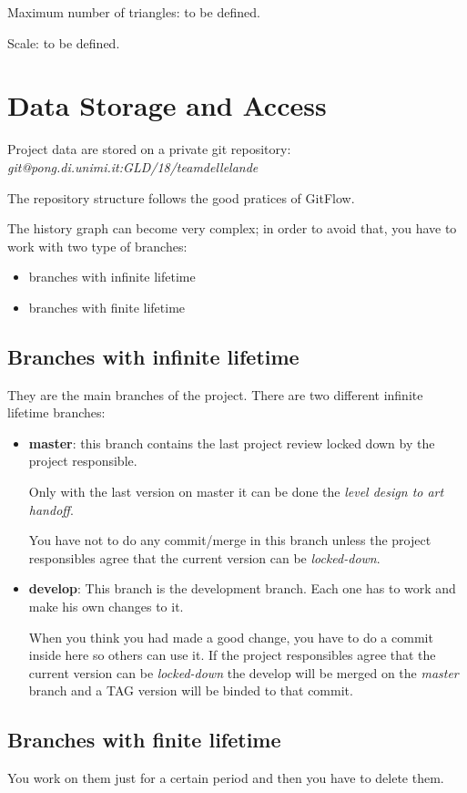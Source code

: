 \documentclass[12pt]{article}
\begin{document}
Maximum number of triangles: to be defined.

Scale: to be defined.

\section{Data Storage and Access}
Project data are stored on a private git repository:\\
	\textit{git@pong.di.unimi.it:GLD/18/teamdellelande}

The repository structure follows the good pratices of GitFlow.

The history graph can become very complex; in order to avoid that, you have to work with two type of branches:
\begin{itemize}
	\item branches with infinite lifetime
	\item branches with finite lifetime
\end{itemize}

\subsection{Branches with infinite lifetime}
They are the main branches of the project. There are two different infinite lifetime branches:
\begin{itemize}
\item \textbf{master}: this branch contains the last project review locked down by the project responsible.
    
  Only with the last version on master it can be done the \textit{level design to art handoff}.
  
  You have not to do any commit/merge in this branch unless the project responsibles agree that the current version can be \textit{locked-down}.
  
\item \textbf{develop}: This branch is the development branch. Each one has to work and make his own changes to it.
  
  When you think you had made a good change, you have to do a commit inside here so others can use it.
  If the project responsibles agree that the current version can be \textit{locked-down} the develop will be merged on the \textit{master} branch and a TAG version will be binded to that commit.
\end{itemize}

\subsection{Branches with finite lifetime}
You work on them just for a certain period and then you have to delete them.
\end{document}
